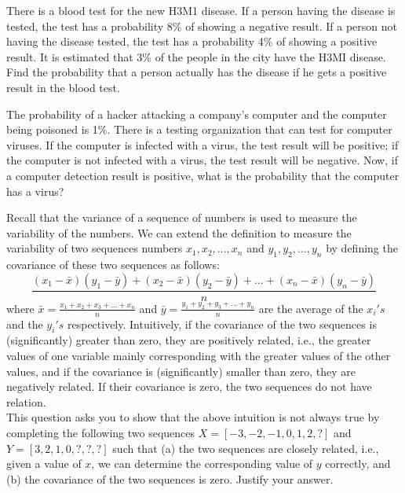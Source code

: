 \documentclass{article}
\begin{document}
\vspace{3\baselineskip}

\noindent There is a blood test for the new H3M1 disease. If a person having the disease is tested, the test has a probability 8\% of showing a negative result. If a person not having the disease tested, the test has a probability 4\% of showing a positive result. It is estimated that 3\% of the people in the city have the H3MI disease. Find the probability that a person actually has the disease if he gets a positive result in the blood test.

\vspace{3\baselineskip}

\noindent The probability of a hacker attacking a company's computer and the computer being poisoned is 1\%. There is a testing organization that can test for computer viruses. If the computer is infected with a virus, the test result will be positive; if the computer is not infected with a virus, the test result will be negative. Now, if a computer detection result is positive, what is the probability that the computer has a virus?

\vspace{3\baselineskip}

\noindent Recall that the variance of a sequence of numbers is used to measure the variability of the numbers. We can extend the definition to measure the variability of two sequences numbers $x_1, x_2,...,x_n$ and $y_1, y_2,...,y_n$ by defining the covariance of these two sequences as follows:
$$\frac{(x_1-\bar{x})(y_1-\bar{y}) + (x_2-\bar{x})(y_2-\bar{y}) + ... + (x_n-\bar{x})(y_n-\bar{y})}{n}$$
where $\bar{x} = \frac{x_1 + x_2 + x_3 + ... + x_n}{n}$ and $\bar{y} = \frac{y_1 + y_2 + y_3 + ... + y_n}{n}$ are the average of the $x_i's$ and the $y_i's$ respectively. Intuitively, if the covariance of the two sequences is (significantly) greater than zero, they are positively related, i.e., the greater values of one variable mainly corresponding with the greater values of the other values, and if the covariance is (significantly) smaller than zero, they are negatively related. If their covariance is zero, the two sequences do not have relation.\\
This question asks you to show that the above intuition is not always true by completing the following two sequences $X = [-3, -2, -1, 0, 1, 2, ?]$ and $Y = [3, 2, 1, 0, ?, ?, ?]$ such that (a) the two sequences are closely related, i.e., given a value of $x$, we can determine the corresponding value of $y$ correctly, and (b) the covariance of the two sequences is zero. Justify your answer.
\end{document}

